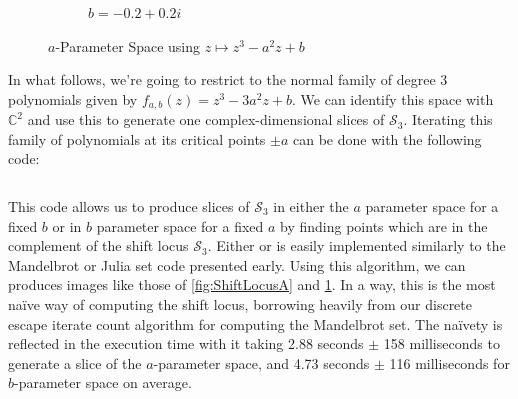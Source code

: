\documentclass{amsart}
\newcommand{\bbC}{\mathbb{C}}
\newcommand{\Shift}[1]{ \mathcal{S}_{#1}}
\theoremstyle{definition}
\theoremstyle{remark}
\numberwithin{equation}{section}
\begin{document}
\begin{figure}[h]
\begin{subfigure}{.32\textwidth}
  \caption{$b=-0.2+0.2i$}
\end{subfigure}
\caption{$a$-Parameter Space using $z\mapsto z^3-a^2z+b$}
\label{fig:ShiftLocusB}
\end{figure}

In what follows, we're going to restrict to the normal family of degree 3 polynomials given by $f_{a,b}(z)=z^3-3a^2z+b$. We can identify this space with $\bbC^2$ and use this to generate one complex-dimensional slices of $\Shift{3}$. Iterating this family of polynomials at its critical points $\pm a$ can be done with the following code:\\

\inputminted[mathescape]{python}{code-snippets/ShiftLocus3.py}

This code allows us to produce slices of $\Shift{3}$ in either the $a$ parameter space for a fixed $b$ or in $b$ parameter space for a fixed $a$ by finding points which are in the complement of the shift locus $\Shift{3}$. Either or is easily implemented similarly to the Mandelbrot or Julia set code presented early. Using this algorithm, we can produces images like those of \cref{fig:ShiftLocusA} and \cref{fig:ShiftLocusB}. In a way, this is the most na\"ive way of computing the shift locus, borrowing heavily from our discrete escape iterate count algorithm for computing the Mandelbrot set. The na\"ivety is reflected in the execution time with it taking 2.88 seconds $\pm$ 158 milliseconds to generate a slice of the $a$-parameter space, and 4.73 seconds $\pm$ 116 milliseconds for $b$-parameter space on average.
\end{document}
